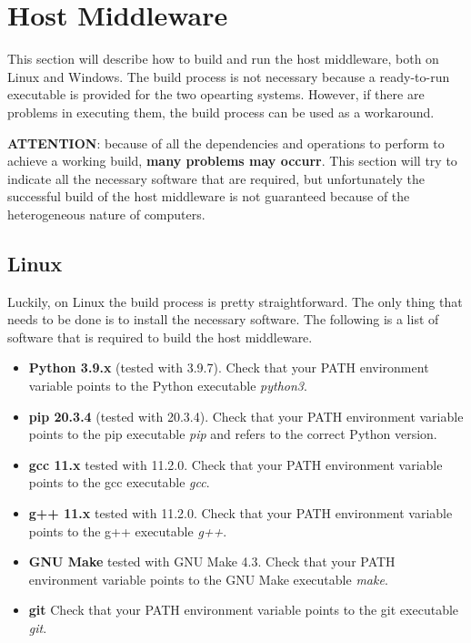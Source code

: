 \section{Host Middleware}

This section will describe how to build and run the host middleware, both on Linux and Windows. The build process is not necessary because a ready-to-run executable is provided for the two opearting systems. However, if there are problems in executing them, the build process can be used as a workaround.

\begin{warning}
\textbf{ATTENTION}: because of all the dependencies and operations to perform to achieve a working build, \textbf{many problems may occurr}. This section will try to indicate all the necessary software that are required, but unfortunately the successful build of the host middleware is not guaranteed because of the heterogeneous nature of computers.
\end{warning}

\subsection{Linux}
Luckily, on Linux the build process is pretty straightforward. The only thing that needs to be done is to install the necessary software. The following is a list of software that is required to build the host middleware.

\begin{itemize}
	\item \textbf{Python 3.9.x} (tested with 3.9.7). Check that your PATH environment variable points to the Python executable \textit{python3}.
	\item \textbf{pip 20.3.4} (tested with 20.3.4). Check that your PATH environment variable points to the pip executable \textit{pip} and refers to the correct Python version.
	\item \textbf{gcc 11.x} {tested with 11.2.0}. Check that your PATH environment variable points to the gcc executable \textit{gcc}.
	\item \textbf{g++ 11.x} {tested with 11.2.0}. Check that your PATH environment variable points to the g++ executable \textit{g++}.
	\item \textbf{GNU Make} {tested with GNU Make 4.3}. Check that your PATH environment variable points to the GNU Make executable \textit{make}.
	\item \textbf{git} Check that your PATH environment variable points to the git executable \textit{git}.
\end{itemize}

